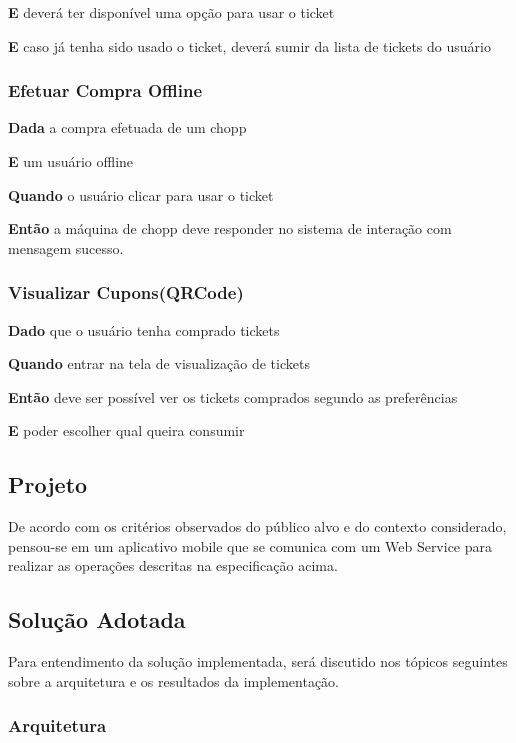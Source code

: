 \textbf{E} deverá ter disponível uma opção para usar o ticket

\textbf{E} caso já tenha sido usado o ticket, deverá sumir da lista de tickets do usuário

\subsubsection{Efetuar Compra Offline}

\textbf{Dada} a compra efetuada de um chopp

\textbf{E} um usuário offline

\textbf{Quando} o usuário clicar para usar o ticket

\textbf{Então} a máquina de chopp deve responder no sistema de interação com mensagem sucesso.

\subsubsection{Visualizar Cupons(QRCode)}

\textbf{Dado} que o usuário tenha comprado tickets

\textbf{Quando} entrar na tela de visualização de tickets

\textbf{Então} deve ser possível ver os tickets comprados segundo as preferências

\textbf{E} poder escolher qual queira consumir

\subsection{Projeto}

De acordo com os critérios observados do público alvo e do contexto considerado, pensou-se em um aplicativo mobile que se comunica com um Web Service para realizar as operações descritas na especificação acima.

\subsection{Solução Adotada}

Para entendimento da solução implementada, será discutido nos tópicos seguintes sobre a arquitetura e os resultados da implementação.

\subsubsection{Arquitetura}

